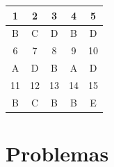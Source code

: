 \documentclass[letterpaper]{article}
\begin{document}
\vspace{3cm}

\begin{center}
\begin{tabular}{|c|c|c|c|c|}
\hline
 1 & 2 & 3 & 4 & 5 \\ \hline
 B & C & D & B & D \\ \hline
 6 & 7 & 8 & 9 & 10 \\ \hline
 A & D & B & A & D \\ \hline
 11 & 12 & 13 & 14 & 15 \\ \hline
 B & C & B & B & E \\ \hline

\end{tabular}
\end{center}


\section*{Problemas}
\end{document}
